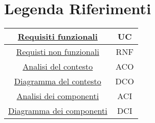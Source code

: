 \section{Legenda Riferimenti}
\label{secD1:LegendaRiferimenti}

\begin{tabular}{|c|c|}
    \hline
    \hyperref[secD2:RequisitiFunzionali]{Requisiti funzionali} & UC\\
    \hline
    \hyperref[secD2:RequisitiNonFunzionali]{Requisti non funzionali} & RNF\\
    \hline
    \hyperref[secD2:AnalisiDelContesto]{Analisi del contesto} & ACO\\
    \hline
    \hyperref[secD2:DiagrammaContesto]{Diagramma del contesto} & DCO\\
    \hline
    \hyperref[secD2:AnalisiDeiComponenti]{Analisi dei componenti} & ACI\\
    \hline
    \hyperref[secD2:DiagrammaComponenti]{Diagramma dei componenti} & DCI\\
    \hline
\end{tabular}